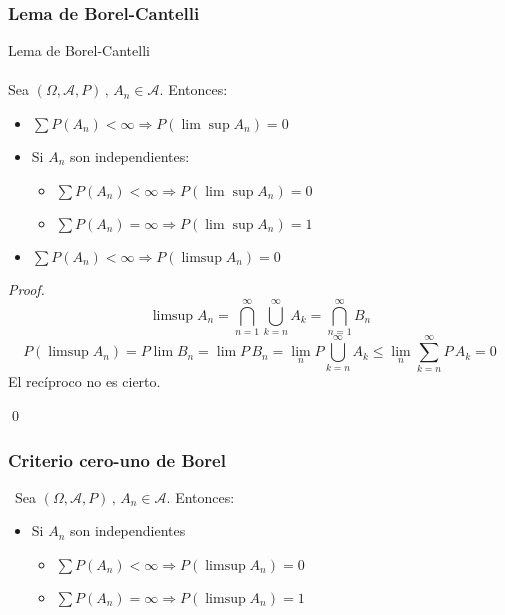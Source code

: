 \subsubsection{Lema de Borel-Cantelli}
\begin{lemma}
Lema de Borel-Cantelli
\\\\
Sea $(\Omega,\mathcal{A},P) \, , \, A_n \in \mathcal{A}$. Entonces:
\begin{itemize}
\item $\displaystyle\sum P(A_n) < \infty \Longrightarrow P(\displaystyle \lim \sup A_n)=0$
\item Si $ A_n$ son independientes:
\begin{itemize}
\item $\displaystyle\sum P(A_n) < \infty \Longrightarrow P(\displaystyle \lim \sup A_n)=0$
\item $\displaystyle\sum P(A_n) = \infty \Longrightarrow P(\displaystyle \lim \sup A_n)=1$
\end{itemize}
\item $\displaystyle\sum P(A_n) < \infty \Longrightarrow P(\displaystyle \limsup A_n)=0$
\end{itemize}
\end{lemma}

\begin{proof}
  $$\limsup A_n=\bigcap_{n=1}^\infty \bigcup_{k=n}^{\infty}A_k=\bigcap_{n=1}^\infty B_n$$
  $$P(\limsup A_n)=P\lim B_n=\lim P\, B_n = \lim_n P\bigcup_{k=n}^\infty A_k \leq \lim_n \sum_{k=n}^\infty P\, A_k=0$$
  El recíproco no es cierto.
  
\qed
\end{proof}

\subsubsection{Criterio cero-uno de Borel}
\begin{criterion} 
  \ 
Sea $(\Omega,\mathcal{A},P) \, , \, A_n \in \mathcal{A}$. Entonces:

\begin{itemize}
\item Si $ A_n$ son independientes 
  \begin{itemize}
  \item $\displaystyle\sum P(A_n) < \infty \Longrightarrow P(\displaystyle \limsup A_n)=0$
  \item $\displaystyle\sum P(A_n) = \infty \Longrightarrow P(\displaystyle \limsup A_n)=1$
  \end{itemize}
\end{itemize}
\end{criterion}

